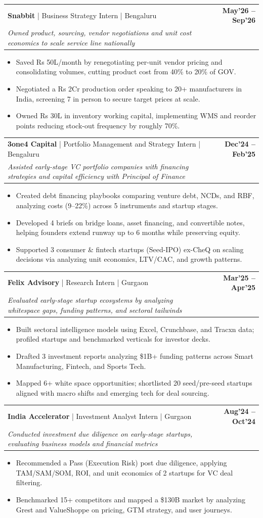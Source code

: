 \documentclass[10pt, a4paper]{article}
\makeatletter
\newcommand{\jobheader}[4]{
  \vspace{-1pt}
  \begin{tabular*}{\textwidth}[t]{l@{\extracolsep{\fill}}r}
    \textbf{#1} \quad | \quad #3 & \textbf{\small #4} \\
    \textit{\small #2} & \\
  \end{tabular*}
  \vspace{-2pt}
}
\newenvironment{achievelist}{
  \begin{itemize}[leftmargin=1.2em, itemsep=0.5pt, parsep=0pt, topsep=1pt]
    \small
}{
  \end{itemize}
  \vspace{-2pt}
}
\newcommand{\achieve}[1]{\item #1}
\makeatother
\begin{document}
\jobheader{Snabbit}{Owned product, sourcing, vendor negotiations and unit cost economics to scale service line nationally}{Business Strategy Intern | Bengaluru}{May'26 -- Sep'26}
\begin{achievelist}
  \achieve{Saved Rs 50L/month by renegotiating per-unit vendor pricing and consolidating volumes, cutting product cost from 40\% to 20\% of GOV.}
  \achieve{Negotiated a Rs 2Cr production order speaking to 20+ manufacturers in India, screening 7 in person to secure target prices at scale.}
  \achieve{Owned Rs 30L in inventory working capital, implementing WMS and reorder points reducing stock-out frequency by roughly 70\%.}
\end{achievelist}

\jobheader{3one4 Capital}{Assisted early-stage VC portfolio companies with financing strategies and capital efficiency with Principal of Finance}{Portfolio Management and Strategy Intern | Bengaluru}{Dec'24 -- Feb'25}
\begin{achievelist}
  \achieve{Created debt financing playbooks comparing venture debt, NCDs, and RBF, analyzing costs (9--22\%) across 5 instruments and startup stages.}
  \achieve{Developed 4 briefs on bridge loans, asset financing, and convertible notes, helping founders extend runway up to 6 months while preserving equity.}
  \achieve{Supported 3 consumer \& fintech startups (Seed-IPO) ex-CheQ on scaling decisions via analyzing unit economics, LTV/CAC, and growth patterns.}
\end{achievelist}

\jobheader{Felix Advisory}{Evaluated early-stage startup ecosystems by analyzing whitespace gaps, funding patterns, and sectoral tailwinds}{Research Intern | Gurgaon}{Mar'25 -- Apr'25}
\begin{achievelist}
  \achieve{Built sectoral intelligence models using Excel, Crunchbase, and Tracxn data; profiled startups and benchmarked verticals for investor decks.}
  \achieve{Drafted 3 investment reports analyzing \$1B+ funding patterns across Smart Manufacturing, Fintech, and Sports Tech.}
  \achieve{Mapped 6+ white space opportunities; shortlisted 20 seed/pre-seed startups aligned with macro shifts and emerging tech for deal sourcing.}
\end{achievelist}

\jobheader{India Accelerator}{Conducted investment due diligence on early-stage startups, evaluating business models and financial metrics}{Investment Analyst Intern | Gurgaon}{Aug'24 -- Oct'24}
\begin{achievelist}
  \achieve{Recommended a Pass (Execution Risk) post due diligence, applying TAM/SAM/SOM, ROI, and unit economics of 2 startups for VC deal filtering.}
  \achieve{Benchmarked 15+ competitors and mapped a \$130B market by analyzing Grest and ValueShoppe on pricing, GTM strategy, and user journeys.}
\end{achievelist}
\end{document}
